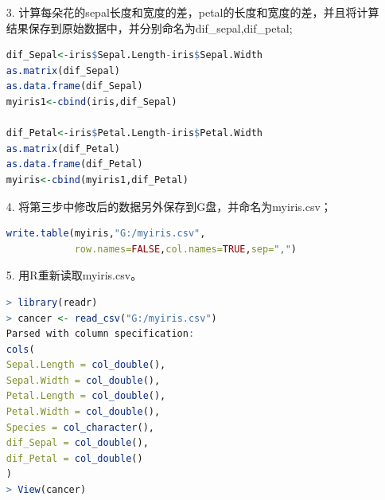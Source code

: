 \documentclass[11pt,a4paper]{ctexart}
\begin{document}
\begin{enumerate}
\hspace*{\fill}
\item[3.]计算每朵花的sepal长度和宽度的差，petal的长度和宽度的差，并且将计算结果保存到原始数据中，并分别命名为dif\_sepal,dif\_petal;

\begin{lstlisting}[language=r]
dif_Sepal<-iris$Sepal.Length-iris$Sepal.Width
as.matrix(dif_Sepal)
as.data.frame(dif_Sepal)
myiris1<-cbind(iris,dif_Sepal)

dif_Petal<-iris$Petal.Length-iris$Petal.Width
as.matrix(dif_Petal)
as.data.frame(dif_Petal)
myiris<-cbind(myiris1,dif_Petal)
\end{lstlisting}


\item[4.]将第三步中修改后的数据另外保存到G盘，并命名为myiris.csv；
\begin{lstlisting}[language=r]
write.table(myiris,"G:/myiris.csv",
			row.names=FALSE,col.names=TRUE,sep=",")
\end{lstlisting}

\item[5.]用R重新读取myiris.csv。
\begin{lstlisting}[language=r]
> library(readr)
> cancer <- read_csv("G:/myiris.csv")
Parsed with column specification:
cols(
Sepal.Length = col_double(),
Sepal.Width = col_double(),
Petal.Length = col_double(),
Petal.Width = col_double(),
Species = col_character(),
dif_Sepal = col_double(),
dif_Petal = col_double()
)
> View(cancer)
\end{lstlisting}
\end{enumerate}
\end{document}
